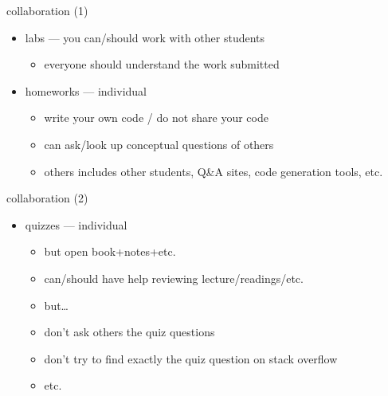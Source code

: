 \begin{frame}{collaboration (1)}
    \begin{itemize}
    \item labs --- you can/should work with other students
        \begin{itemize}
        \item everyone should understand the work submitted
        \end{itemize}
    \item homeworks --- individual
        \begin{itemize}
        \item write your own code / do not share your code
        \item can ask/look up conceptual questions of others
        \item others includes other students, Q\&A sites, code generation tools, etc.
        \end{itemize}
    \end{itemize}
\end{frame}

\begin{frame}{collaboration (2)}
    \begin{itemize}
    \item quizzes --- individual
        \begin{itemize}
        \item but open book+notes+etc.
        \item can/should have help reviewing lecture/readings/etc.
        \item but\ldots
        \item don't ask others the quiz questions
        \item don't try to find exactly the quiz question on stack overflow
        \item etc.
        \end{itemize}
    \end{itemize}
\end{frame}
